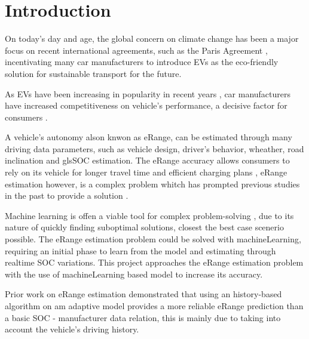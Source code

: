 \chapter{Introduction}
\label{cha:introduction}

On today's day and age, the global concern on climate
change has been a major focus on recent international agreements,
such as the Paris Agreement \citep{parisAgreement},
incentivating many car manufacturers to introduce
\gls{EVs} as the eco-friendly
solution for sustainable transport for the future.


As \gls{EVs} have been increasing in popularity in
recent years , car manufacturers have
increased competitiveness on vehicle's performance,
a decisive factor for consumers \citep{EGBUE2012717}.


A vehicle's autonomy alson knwon as \gls{eRange},
can be estimated through many driving data parameters,
such as vehicle design, driver's behavior, wheather,
road inclination and gls{SOC} estimation.
The \gls{eRange} accuracy allows consumers to rely
on its vehicle for longer travel time and efficient
charging plans , \gls{eRange} estimation
however, is a complex problem whitch has prompted
previous studies in the past to provide a solution 
\citep{classicEVX, predictionOfeRange}.

Machine learning is offen a viable tool for complex
problem-solving , due to its nature
of quickly finding suboptimal solutions,
closest the best case scenerio possible.
The \gls{eRange} estimation problem could be solved
with \gls{machineLearning}, requiring an initial
phase to learn from the model and estimating
through realtime \gls{SOC} variations.
This project approaches the \gls{eRange} estimation
problem with the use of \gls{machineLearning} based
model to increase its accuracy.

Prior work \citep{classicEVX} on \gls{eRange}
estimation demonstrated that using an
history-based algorithm on am adaptive model
provides a more reliable \gls{eRange} prediction
than a basic \gls{SOC} - manufacturer data relation,
this is mainly due to taking into account the
vehicle's driving history.

